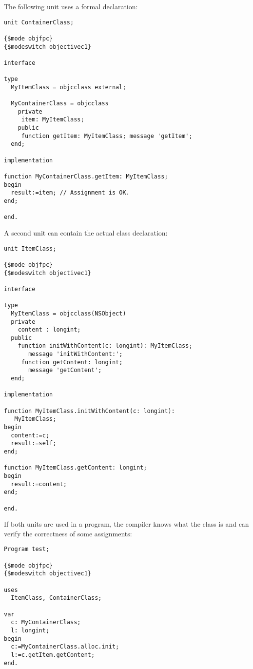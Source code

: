 The following unit uses a formal declaration:
\begin{verbatim}
unit ContainerClass;
 
{$mode objfpc}
{$modeswitch objectivec1}
 
interface
 
type
  MyItemClass = objcclass external;
 
  MyContainerClass = objcclass
    private
     item: MyItemClass;
    public
     function getItem: MyItemClass; message 'getItem';
  end;
 
implementation
 
function MyContainerClass.getItem: MyItemClass;
begin
  result:=item; // Assignment is OK.
end;
 
end.
\end{verbatim}
A second unit can contain the actual class declaration:
\begin{verbatim}
unit ItemClass;
 
{$mode objfpc}
{$modeswitch objectivec1}
 
interface
 
type
  MyItemClass = objcclass(NSObject)
  private
    content : longint;
  public
    function initWithContent(c: longint): MyItemClass; 
       message 'initWithContent:';
     function getContent: longint; 
       message 'getContent';
  end;
 
implementation
 
function MyItemClass.initWithContent(c: longint): 
   MyItemClass;
begin
  content:=c;
  result:=self;
end;
 
function MyItemClass.getContent: longint;
begin
  result:=content;
end;
 
end.
\end{verbatim}
If both units are used in a program, the compiler knows what the class is
and can verify the correctness of some assignments:
\begin{verbatim}
Program test;
 
{$mode objfpc}
{$modeswitch objectivec1}
 
uses
  ItemClass, ContainerClass;
 
var
  c: MyContainerClass;
  l: longint;
begin
  c:=MyContainerClass.alloc.init;
  l:=c.getItem.getContent;
end.
\end{verbatim}

